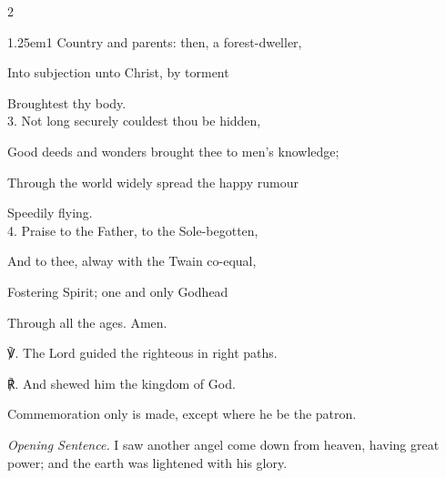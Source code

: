 \begin{paracol}{2}
\begin{hangparas}{1.25em}{1}
Country and parents: then, a forest-dweller,

Into subjection unto Christ, by torment

Broughtest thy body.\\

3. Not long securely couldest thou be hidden,

Good deeds and wonders brought thee to men's knowledge;

Through the world widely spread the happy rumour

Speedily flying.\\

4. Praise to the Father, to the Sole-begotten,

And to thee, alway with the Twain co-equal,

Fostering Spirit; one and only Godhead

Through all the ages. Amen.\\
\end{hangparas}

    ℣. The Lord guided the righteous in right paths.

	℟. And shewed him the kingdom of God.
	


	\fussy
\end{paracol}




\begin{rubric}
	Commemoration only is made, except where he be the patron.
\end{rubric}

\par\noindent
\textit{Opening Sentence.} I saw another angel come down from heaven, having great power; and the earth was lightened with his glory.


